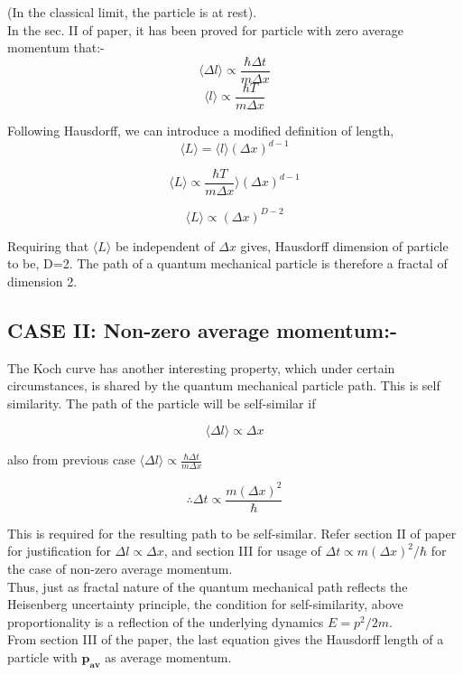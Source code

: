 \documentclass[14pt]{extarticle}
\begin{document}
(In the classical limit, the particle is at rest).\\
In the sec. II of paper, it has been proved for particle with zero average momentum that:-
$$\langle \Delta l \rangle \propto \frac{\hbar \Delta t}{m \Delta x}$$
$$\langle  l \rangle \propto \frac{\hbar T}{m \Delta x}$$

Following Hausdorff, we can introduce a modified definition of length,\\

$$\langle  L \rangle= \langle l \rangle (\Delta x)^{d-1}$$

$$\langle  L \rangle \propto \frac{\hbar T}{m \Delta x}  \rangle (\Delta x)^{d-1}$$

$$\langle  L \rangle \propto (\Delta x)^{D-2}$$

Requiring that $\langle L \rangle$ be independent of $\Delta x$ gives, Hausdorff dimension of particle to be, D=2. The path of a quantum mechanical particle is therefore a fractal of dimension 2.

\subsection{CASE II: Non-zero average momentum:-}

The Koch curve has another interesting property, which under certain circumstances, is shared by the quantum mechanical particle path. This is self similarity. The path of the particle will be self-similar if

$$\langle \Delta l \rangle \propto \Delta x$$

also from previous case $\langle \Delta l \rangle \propto \frac{\hbar \Delta t}{m \Delta x}$

$$\therefore \Delta t \propto \frac{m (\Delta x)^2}{\hbar}$$

This is required for the resulting path to be self-similar. Refer section II of paper for justification for $\Delta l \propto \Delta x$, and section III for usage of $\Delta t \propto m (\Delta x)^2 / \hbar$ for the case of non-zero average momentum.\\
Thus, just as fractal nature of the quantum mechanical path reflects the Heisenberg uncertainty principle, the condition for self-similarity, above proportionality is a reflection of the underlying dynamics $E=p^2 /2m$.\\

From section III of the paper, the last equation gives the Hausdorff length of a particle with $\mathbf{p_{av}}$ as average momentum.
\end{document}
